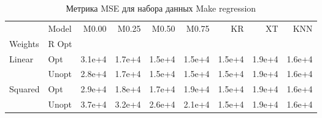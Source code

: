 \begin{table}
\caption{Метрика MSE для набора данных Make regression}
\label{tab:MSE_Make regression}
\begin{tabular}{llrrrrrrr}
\toprule
 & Model & M0.00 & M0.25 & M0.50 & M0.75 & KR & XT & KNN \\
Weights & R Opt &  &  &  &  &  &  &  \\
\midrule
\multirow[t]{2}{*}{Linear} & Opt & 3.1e+4 & 1.7e+4 & 1.5e+4 & 1.5e+4 & 1.5e+4 & 1.9e+4 & 1.6e+4 \\
 & Unopt & 2.8e+4 & 1.7e+4 & 1.5e+4 & 1.5e+4 & 1.5e+4 & 1.9e+4 & 1.6e+4 \\

\multirow[t]{2}{*}{Squared} & Opt & 2.9e+4 & 1.8e+4 & 1.7e+4 & 1.9e+4 & 1.5e+4 & 1.9e+4 & 1.6e+4 \\
 & Unopt & 3.7e+4 & 3.2e+4 & 2.6e+4 & 2.1e+4 & 1.5e+4 & 1.9e+4 & 1.6e+4 \\

\bottomrule
\end{tabular}
\end{table}
